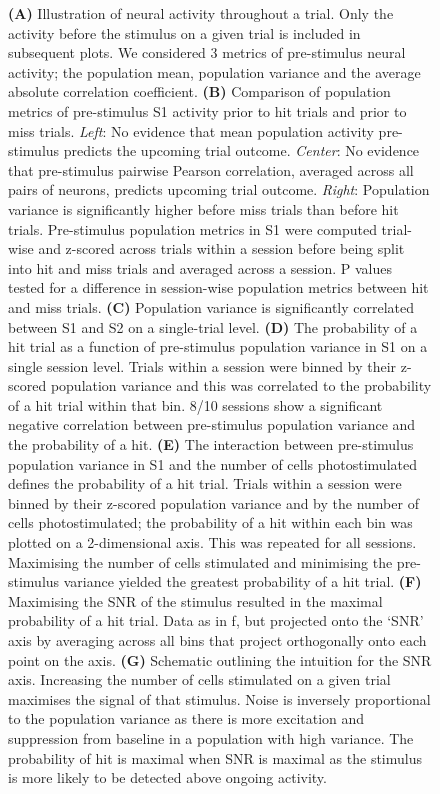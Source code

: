 \begin{figure}[h!]
{\textbf{(A)} Illustration of neural activity throughout a trial. Only the activity before the stimulus on a given trial is included in subsequent plots. We considered 3 metrics of pre-stimulus neural activity; the population mean, population variance and the average absolute correlation coefficient. \textbf{(B)} Comparison of population metrics of pre-stimulus S1 activity prior to hit trials and prior to miss trials. \textit{Left}: No evidence that mean population activity pre-stimulus predicts the upcoming trial outcome. \textit{Center}: No evidence that pre-stimulus pairwise Pearson correlation, averaged across all pairs of neurons, predicts upcoming trial outcome. \textit{Right}: Population variance is significantly higher before miss trials than before hit trials. Pre-stimulus population metrics in S1 were computed trial-wise and z-scored across trials within a session before being split into hit and miss trials and averaged across a session. P values tested for a difference in session-wise population metrics between hit and miss trials. \textbf{(C)} Population variance is significantly correlated between S1 and S2 on a single-trial level. \textbf{(D)} The probability of a hit trial as a function of pre-stimulus population variance in S1 on a single session level. Trials within a session were binned by their z-scored population variance and this was correlated to the probability of a hit trial within that bin. 8/10 sessions show a significant negative correlation between pre-stimulus population variance and the probability of a hit. \textbf{(E)} The interaction between pre-stimulus population variance in S1 and the number of cells photostimulated defines the probability of a hit trial. Trials within a session were binned by their z-scored population variance and by the number of cells photostimulated; the probability of a hit within each bin was plotted on a 2-dimensional axis. This was repeated for all sessions. Maximising the number of cells stimulated and minimising the pre-stimulus variance yielded the greatest probability of a hit trial. \textbf{(F)} Maximising the SNR of the stimulus resulted in the maximal probability of a hit trial. Data as in f, but projected onto the ‘SNR’ axis by averaging across all bins that project orthogonally onto each point on the axis. \textbf{(G)} Schematic outlining the intuition for the SNR axis. Increasing the number of cells stimulated on a given trial maximises the signal of that stimulus. Noise is inversely proportional to the population variance as there is more excitation and suppression from baseline in a population with high variance. The probability of hit is maximal when SNR is maximal as the stimulus is more likely to be detected above ongoing activity. 
} 
\label{fig:figure4}
\end{figure}

